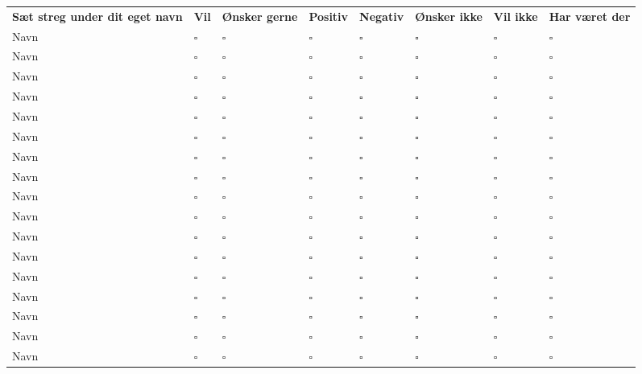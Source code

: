 \documentclass[10pt,a4paper,letterpaper]{article}
\begin{document}
\begin{tabular}{L{3.3cm}C{1.5cm}C{1.5cm}C{1.5cm}C{1.5cm}C{1.5cm}C{1.5cm}C{1.8cm}}
  \textbf{Sæt streg under dit eget navn} &
  \textbf{Vil}                           &
  \textbf{Ønsker gerne}                  &
  \textbf{Positiv}                       &
  \textbf{Negativ} &
  \textbf{Ønsker ikke} &
  \textbf{Vil ikke} &
  \textbf{Har været der} \\

Navn & $\square$ & $\square$ & $\square$ & $\square$ & $\square$ & $\square$ & $\square$ \\
Navn & $\square$ & $\square$ & $\square$ & $\square$ & $\square$ & $\square$ & $\square$ \\
Navn & $\square$ & $\square$ & $\square$ & $\square$ & $\square$ & $\square$ & $\square$ \\
Navn & $\square$ & $\square$ & $\square$ & $\square$ & $\square$ & $\square$ & $\square$ \\
Navn & $\square$ & $\square$ & $\square$ & $\square$ & $\square$ & $\square$ & $\square$ \\
Navn & $\square$ & $\square$ & $\square$ & $\square$ & $\square$ & $\square$ & $\square$ \\
Navn & $\square$ & $\square$ & $\square$ & $\square$ & $\square$ & $\square$ & $\square$ \\
Navn & $\square$ & $\square$ & $\square$ & $\square$ & $\square$ & $\square$ & $\square$ \\
Navn & $\square$ & $\square$ & $\square$ & $\square$ & $\square$ & $\square$ & $\square$ \\
Navn & $\square$ & $\square$ & $\square$ & $\square$ & $\square$ & $\square$ & $\square$ \\
Navn & $\square$ & $\square$ & $\square$ & $\square$ & $\square$ & $\square$ & $\square$ \\
Navn & $\square$ & $\square$ & $\square$ & $\square$ & $\square$ & $\square$ & $\square$ \\
Navn & $\square$ & $\square$ & $\square$ & $\square$ & $\square$ & $\square$ & $\square$ \\
Navn & $\square$ & $\square$ & $\square$ & $\square$ & $\square$ & $\square$ & $\square$ \\
Navn & $\square$ & $\square$ & $\square$ & $\square$ & $\square$ & $\square$ & $\square$ \\
Navn & $\square$ & $\square$ & $\square$ & $\square$ & $\square$ & $\square$ & $\square$ \\
Navn & $\square$ & $\square$ & $\square$ & $\square$ & $\square$ & $\square$ & $\square$ \\

\end{tabular}
\end{document}
